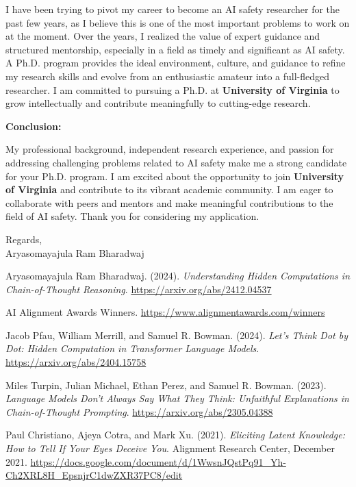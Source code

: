 \documentclass[12pt]{article}
\begin{document}
I have been trying to pivot my career to become an AI safety researcher for the past few years, as I believe this is one of the most important problems to work on at the moment. Over the years, I realized the value of expert guidance and structured mentorship, especially in a field as timely and significant as AI safety. A Ph.D. program provides the ideal environment, culture, and guidance to refine my research skills and evolve from an enthusiastic amateur into a full-fledged researcher. I am committed to pursuing a Ph.D. at \textbf{University of Virginia} to grow intellectually and contribute meaningfully to cutting-edge research.

\textbf{Conclusion:}

My professional background, independent research experience, and passion for addressing challenging problems related to AI safety make me a strong candidate for your Ph.D. program. I am excited about the opportunity to join \textbf{University of Virginia} and contribute to its vibrant academic community. I am eager to collaborate with peers and mentors and make meaningful contributions to the field of AI safety. Thank you for considering my application.

Regards,\\
Aryasomayajula Ram Bharadwaj

\newpage
\begin{thebibliography}{9}

Aryasomayajula Ram Bharadwaj. (2024). \emph{Understanding Hidden Computations in Chain-of-Thought Reasoning}.  
\url{https://arxiv.org/abs/2412.04537}

AI Alignment Awards Winners.  
\url{https://www.alignmentawards.com/winners}

Jacob Pfau, William Merrill, and Samuel R. Bowman. (2024). \emph{Let's Think Dot by Dot: Hidden Computation in Transformer Language Models}.  
\url{https://arxiv.org/abs/2404.15758}

Miles Turpin, Julian Michael, Ethan Perez, and Samuel R. Bowman. (2023). \emph{Language Models Don't Always Say What They Think: Unfaithful Explanations in Chain-of-Thought Prompting}.  
\url{https://arxiv.org/abs/2305.04388}

Paul Christiano, Ajeya Cotra, and Mark Xu. (2021). \emph{Eliciting Latent Knowledge: How to Tell If Your Eyes Deceive You}. Alignment Research Center, December 2021.  
\url{https://docs.google.com/document/d/1WwsnJQstPq91_Yh-Ch2XRL8H_EpsnjrC1dwZXR37PC8/edit}

\end{thebibliography}
\end{document}
